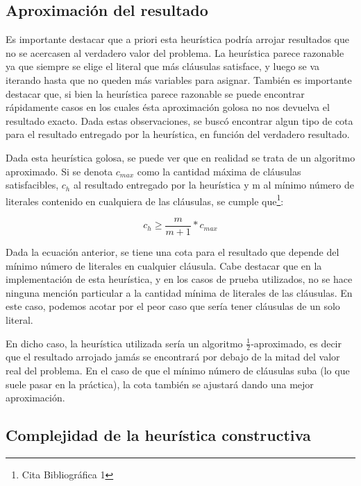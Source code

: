 \documentclass[a4paper,10pt]{article}
\begin{document}
\subsection*{Aproximaci\'on del resultado}

Es importante destacar que a priori esta heur\'istica podr\'ia arrojar resultados que no se acercasen al verdadero valor del problema. La heur\'istica parece razonable ya que siempre se elige el literal que m\'as cl\'ausulas satisface, y luego se va iterando hasta que no queden m\'as variables para asignar. Tambi\'en es importante destacar que, si bien la heur\'istica parece razonable se puede encontrar r\'apidamente casos en los cuales \'esta aproximaci\'on golosa no nos devuelva el resultado exacto. Dada estas observaciones, se busc\'o encontrar algun tipo de cota para el resultado entregado por la heur\'istica, en funci\'on del verdadero resultado.

Dada esta heur\'istica golosa, se puede ver que en realidad se trata de un algoritmo aproximado. Si se denota $c_{max}$ como la cantidad m\'axima de cl\'ausulas satisfacibles, $c_h$ al resultado entregado por la heur\'istica y m al m\'inimo n\'umero de literales contenido en cualquiera de las cl\'ausulas, se cumple que\footnote{Cita Bibliogr\'afica 1}:


\begin{equation}
c_h \geq \frac{m}{m+1}*c_{max}
\end{equation}

Dada la ecuaci\'on anterior, se tiene una cota para el resultado que depende del m\'inimo n\'umero de literales en cualquier cl\'ausula. Cabe destacar que en la implementaci\'on de esta heur\'istica, y en los casos de prueba utilizados, no se hace ninguna menci\'on particular a la cantidad m\'inima de literales de las cl\'ausulas. En este caso, podemos acotar por el peor caso que ser\'ia tener cl\'ausulas de un solo literal.

En dicho caso, la heur\'istica utilizada ser\'ia un algoritmo $\frac{1}{2}$-aproximado, es decir que el resultado arrojado jam\'as se encontrar\'a por debajo de la mitad del valor real del problema. En el caso de que el m\'inimo n\'umero de cl\'ausulas suba (lo que suele pasar en la pr\'actica), la cota tambi\'en se ajustar\'a dando una mejor aproximaci\'on.

\subsection*{Complejidad de la heur\'istica constructiva}
\end{document}
